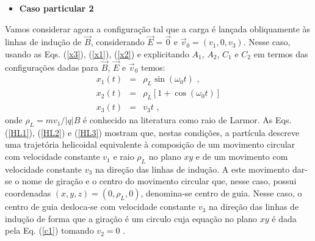 \documentclass[twocolumn]{rbef}
\newcommand{\1}{\mathbbm{1}}
\begin{document}
\begin{itemize}
\item \textbf{Caso particular 2}
\end{itemize}

Vamos considerar agora a configuração tal que a carga é lançada
obliquamente às linhas de indução de $\vec{B}$, considerando
$\vec{E}=\vec{0}$ e $\vec{v}_{0} = (v_{1},0,v_{3})$. Nesse caso, usando
as Eqs. (\ref{x3}), (\ref{x1}), (\ref{x2}) e explicitando $A_{1}$,
$A_{2}$, $C_{1}$ e $C_{2}$ em termos das configurações dadas para
$\vec{B}$, $\vec{E}$ e $\vec{v}_{0}$ temos:
\begin{eqnarray}
  x_{1}\left( t\right)  &=& \rho_{L} \sin \left(
                            \omega_{0} t\right)  \label{HL1} \text{ ,} \\
  x_{2}\left( t\right)  &=& \rho_{L} \left[ 1 + \cos \left(
                            \omega_{0} t\right) \right]   \label{HL2}\\
  x_{3}\left( t\right) &=& v_{3} t \text{ ,} \label{HL3}
\end{eqnarray}%
onde $\rho_{L} = m v_{1} / \vert q \vert B$ é conhecido na literatura
como raio de Larmor. As Eqs. (\ref{HL1}), (\ref{HL2}) e (\ref{HL3})
mostram que, nestas condições, a partícula descreve uma trajetória
helicoidal equivalente à composição de um movimento circular com
velocidade constante %
$v_{1}$ e raio $\rho_{L}$ no plano
$xy$ e de um movimento com velocidade constante %
$v_{3}$ na direção das linhas de indução. A este movimento dar-se o nome
de giração e o centro do movimento circular que, nesse caso, possui
coordenadas $(x,y,z)=(0,\rho_{L},0)$, denomina-se centro de guia. Nesse
caso, o centro de guia desloca-se com velocidade constante $v_{3}$ na
direção das linhas de indução de forma que a giração é um circulo cuja
equação no plano $xy$ é dada pela Eq. (\ref{c1}) tomando $v_{2}=0$
\cite{Viana}.
\end{document}
